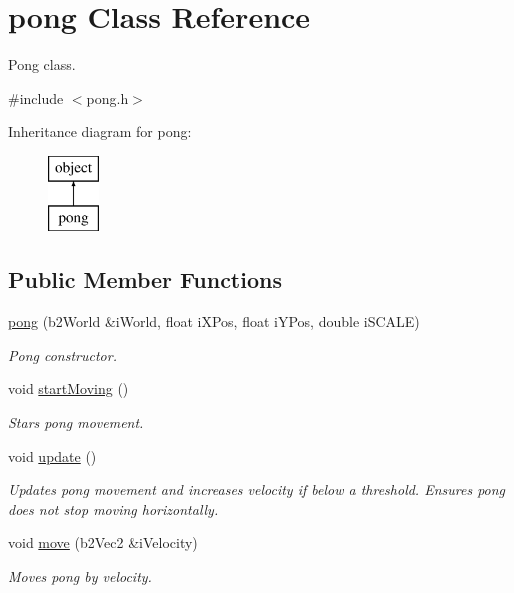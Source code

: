 \hypertarget{classpong}{}\section{pong Class Reference}
\label{classpong}


Pong class.  




{\ttfamily \#include $<$pong.\+h$>$}

Inheritance diagram for pong\+:\begin{figure}[H]
\begin{center}
\leavevmode
\includegraphics[height=2.000000cm]{classpong}
\end{center}
\end{figure}
\subsection*{Public Member Functions}
\begin{DoxyCompactItemize}
\item 
\hyperlink{classpong_aba99737cd7a044d2d943501433229702}{pong} (b2\+World \&i\+World, float i\+X\+Pos, float i\+Y\+Pos, double i\+S\+C\+A\+LE)
\begin{DoxyCompactList}\small\item\em Pong constructor. \end{DoxyCompactList}\item 
void \hyperlink{classpong_af5da04e472da35472a1ad0229e36480a}{start\+Moving} ()
\begin{DoxyCompactList}\small\item\em Stars pong movement. \end{DoxyCompactList}\item 
void \hyperlink{classpong_a2f36425bd4f142cf23efb4928a49f183}{update} ()
\begin{DoxyCompactList}\small\item\em Updates pong movement and increases velocity if below a threshold. Ensures pong does not stop moving horizontally. \end{DoxyCompactList}\item 
void \hyperlink{classpong_a9b9d00c224e64244a82b4c2bcea0633b}{move} (b2\+Vec2 \&i\+Velocity)
\begin{DoxyCompactList}\small\item\em Moves pong by velocity. \end{DoxyCompactList}\end{DoxyCompactItemize}


